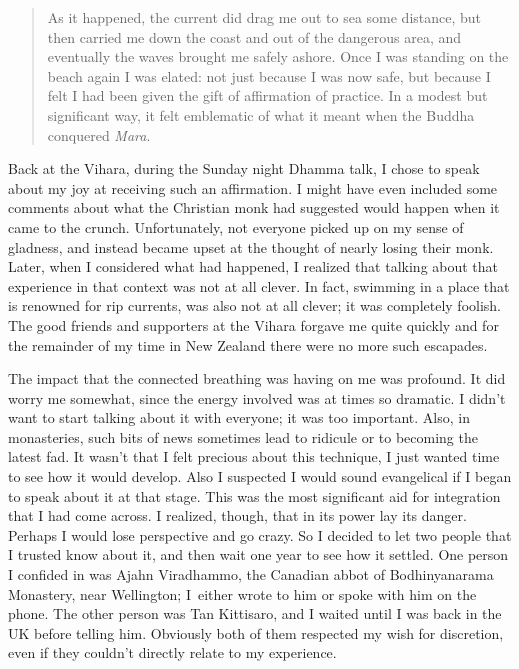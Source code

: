 \begin{quotation}
As it happened, the current did drag me out to sea some distance, but
then carried me down the coast and out of the dangerous area, and
eventually the waves brought me safely ashore. Once I was standing on
the beach again I was elated: not just because I was now safe, but
because I felt I had been given the gift of affirmation of practice. In
a modest but significant way, it felt emblematic of what it meant when
the Buddha conquered \emph{Mara}.
\end{quotation}

Back at the Vihara, during the Sunday night Dhamma talk, I chose to
speak about my joy at receiving such an affirmation. I might have even
included some comments about what the Christian monk had suggested would
happen when it came to the crunch. Unfortunately, not everyone picked up
on my sense of gladness, and instead became upset at the thought of
nearly losing their monk. Later, when I considered what had happened, I
realized that talking about that experience in that context was not at
all clever. In fact, swimming in a place that is renowned for rip
currents, was also not at all clever; it was completely foolish. The
good friends and supporters at the Vihara forgave me quite quickly and
for the remainder of my time in New Zealand there were no more such
escapades.

The impact that the connected breathing was having on me was profound.
It did worry me somewhat, since the energy involved was at times so
dramatic. I didn't want to start talking about it with everyone; it was
too important. Also, in monasteries, such bits of news sometimes lead to
ridicule or to becoming the latest fad. It wasn't that I felt precious
about this technique, I just wanted time to see how it would develop.
Also I suspected I would sound evangelical if I began to speak about it
at that stage. This was the most significant aid for integration that I
had come across. I realized, though, that in its power lay its danger.
Perhaps I would lose perspective and go crazy. So I decided to let two
people that I trusted know about it, and then wait one year to see how
it settled. One person I confided in was Ajahn Viradhammo, the Canadian
abbot of Bodhinyanarama Monastery, near Wellington; I~either wrote to
him or spoke with him on the phone. The other person was Tan Kittisaro,
and I waited until I was back in the UK before telling him. Obviously both of them
respected my wish for discretion, even if they couldn't directly relate
to my experience.

